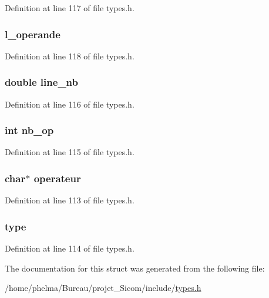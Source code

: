 Definition at line 117 of file types.\-h.

\hypertarget{struct__data___acdac487d99d10dba873a0f07707b220f}{
\subsubsection[{l\-\_\-operande}]{ l\-\_\-operande}}\label{struct__data___acdac487d99d10dba873a0f07707b220f}


Definition at line 118 of file types.\-h.

\hypertarget{struct__data___a808a37180ef5a21555b2f0f68cf73cb6}{
\subsubsection[{line\-\_\-nb}]{\setlength{\rightskip}{0pt plus 5cm}double line\-\_\-nb}}\label{struct__data___a808a37180ef5a21555b2f0f68cf73cb6}


Definition at line 116 of file types.\-h.

\hypertarget{struct__data___a88a29c0db6a919d126d1c94d573dd711}{
\subsubsection[{nb\-\_\-op}]{\setlength{\rightskip}{0pt plus 5cm}int nb\-\_\-op}}\label{struct__data___a88a29c0db6a919d126d1c94d573dd711}


Definition at line 115 of file types.\-h.

\hypertarget{struct__data___adc2a267b945f31e8e0dad4b528128cab}{
\subsubsection[{operateur}]{\setlength{\rightskip}{0pt plus 5cm}char$\ast$ operateur}}\label{struct__data___adc2a267b945f31e8e0dad4b528128cab}


Definition at line 113 of file types.\-h.

\hypertarget{struct__data___a610c78eb1986b43eaacecfddf32b24d2}{
\subsubsection[{type}]{ type}}\label{struct__data___a610c78eb1986b43eaacecfddf32b24d2}


Definition at line 114 of file types.\-h.



The documentation for this struct was generated from the following file\-:\begin{DoxyCompactItemize}
\item 
/home/phelma/\-Bureau/projet\-\_\-\-Sicom/include/\hyperlink{types_8h}{types.\-h}\end{DoxyCompactItemize}
